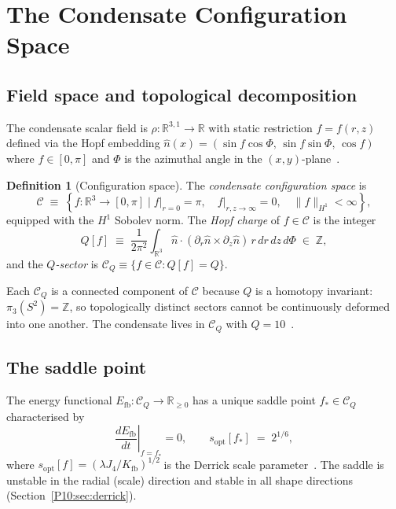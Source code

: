 \documentclass[11pt,a4paper]{article}
\theoremstyle{definition}
\newtheorem{definition}[theorem]{Definition}
\theoremstyle{remark}
\newcommand{\lam}{\lambda}
\newcommand{\Kfb}{K_{\mathrm{fb}}}
\newcommand{\Efb}{E_{\mathrm{fb}}}
\newcommand{\Jfour}{J_{4}}
\newcommand{\sopt}{s_{\mathrm{opt}}}
\newcommand{\RR}{\mathbb{R}}
\newcommand{\ZZ}{\mathbb{Z}}
\newcommand{\CQ}{\mathcal{C}_Q}
\begin{document}
\section{The Condensate Configuration Space}
\label{P10:sec:config}

\subsection{Field space and topological decomposition}

The condensate scalar field is $\rho:\RR^{3,1}\to\RR$ with static
restriction $f = f(r,z)$ defined via the Hopf embedding
$\hat{n}(x) = (\sin f\cos\Phi,\,\sin f\sin\Phi,\,\cos f)$
where $f\in[0,\pi]$ and $\Phi$ is the azimuthal angle in the
$(x,y)$-plane~\cite{Paper1}.

\begin{definition}[Configuration space]
\label{P10:def:config}
The \emph{condensate configuration space} is
\begin{equation}
  \mathcal{C}
  \;\equiv\; \left\{f:\RR^3\to[0,\pi]
  \;\Big|\;
  f\big|_{r=0}=\pi,\quad
  f\big|_{r,z\to\infty}=0,\quad
  \|f\|_{H^1}<\infty
  \right\},
  \label{P10:eq:config}
\end{equation}
equipped with the $H^1$ Sobolev norm.
The \emph{Hopf charge} of $f\in\mathcal{C}$ is the integer
\begin{equation}
  Q[f] \;\equiv\; \frac{1}{2\pi^2}\int_{\RR^3}
  \hat{n}\cdot(\partial_r\hat{n}\times\partial_z\hat{n})\,
  r\,dr\,dz\,d\Phi
  \;\in\; \ZZ,
  \label{P10:eq:hopf_charge}
\end{equation}
and the \emph{$Q$-sector} is $\CQ \equiv \{f\in\mathcal{C} : Q[f]=Q\}$.
\end{definition}

Each $\CQ$ is a connected component of $\mathcal{C}$ because $Q$ is
a homotopy invariant: $\pi_3(S^2)=\ZZ$, so topologically distinct
sectors cannot be continuously deformed into one another.
The condensate lives in $\CQ$ with $Q=10$~\cite{Paper1}.

\subsection{The saddle point}

The energy functional $\Efb:\CQ\to\RR_{\geq0}$ has a unique
saddle point $f_*\in\CQ$ characterised by
\begin{equation}
  \left.\frac{d\Efb}{dt}\right|_{f=f_*} = 0,
  \qquad
  \sopt[f_*] \;=\; 2^{1/6},
  \label{P10:eq:saddle_conditions}
\end{equation}
where $\sopt[f] = (\lam\Jfour/\Kfb)^{1/2}$ is the Derrick scale
parameter~\cite{Paper9}.
The saddle is unstable in the radial (scale) direction and stable
in all shape directions (Section~\ref{P10:sec:derrick}).
\end{document}
